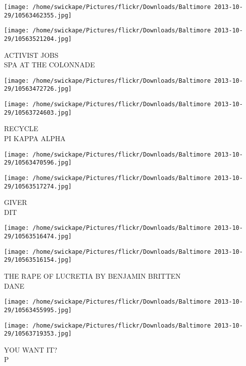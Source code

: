 \documentclass[10pt,letterpaper]{article}
\begin{document}
\texttt{[image: /home/swickape/Pictures/flickr/Downloads/Baltimore 2013-10-29/10563462355.jpg]}

\vspace{0.25in}
\texttt{[image: /home/swickape/Pictures/flickr/Downloads/Baltimore 2013-10-29/10563521204.jpg]}

ACTIVIST JOBS\\
SPA AT THE COLONNADE\\
\pagebreak

\texttt{[image: /home/swickape/Pictures/flickr/Downloads/Baltimore 2013-10-29/10563472726.jpg]}

\vspace{0.25in}
\texttt{[image: /home/swickape/Pictures/flickr/Downloads/Baltimore 2013-10-29/10563724603.jpg]}

RECYCLE\\
PI KAPPA ALPHA\\
\pagebreak

\texttt{[image: /home/swickape/Pictures/flickr/Downloads/Baltimore 2013-10-29/10563470596.jpg]}

\vspace{0.25in}
\texttt{[image: /home/swickape/Pictures/flickr/Downloads/Baltimore 2013-10-29/10563517274.jpg]}

GIVER\\
DIT\\
\pagebreak

\texttt{[image: /home/swickape/Pictures/flickr/Downloads/Baltimore 2013-10-29/10563516474.jpg]}

\vspace{0.25in}
\texttt{[image: /home/swickape/Pictures/flickr/Downloads/Baltimore 2013-10-29/10563516154.jpg]}

THE RAPE OF LUCRETIA BY BENJAMIN BRITTEN\\
DANE\\
\pagebreak

\texttt{[image: /home/swickape/Pictures/flickr/Downloads/Baltimore 2013-10-29/10563455995.jpg]}

\vspace{0.25in}
\texttt{[image: /home/swickape/Pictures/flickr/Downloads/Baltimore 2013-10-29/10563719353.jpg]}

YOU WANT IT?\\
P\\
\pagebreak
\end{document}
